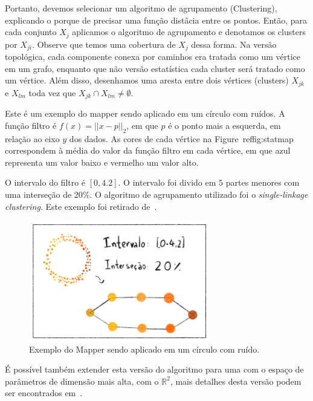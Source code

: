 Portanto, devemos selecionar um algoritmo de agrupamento (Clustering), explicando o 
porque de precisar uma função distâcia entre os pontos. Então, para cada conjunto $X_j$ aplicamos 
o algoritmo de agrupamento e denotamos os clusters por $X_{ji}$. Observe que temos uma cobertura
de $X_j$ dessa forma. Na versão topológica, cada componente conexa por caminhos era tratada como
um vértice em um grafo, enquanto que não versão estatística cada cluster será tratado como
um vértice. Além disso, desenhamos uma aresta entre dois vértices (clusters) $X_{jk}$ e 
$X_{lm}$ toda vez que $X_{jk} \cap X_{lm} \neq \emptyset$.

\begin{ex}
    Este é um exemplo do mapper sendo aplicado em um círculo com ruídos. A função filtro
    é $f(x) = || x - p ||_2$, em que $p$ é o ponto mais a esquerda, em relação ao eixo $y$
    dos dados. As cores de cada vértice na Figure~ref{fig:statmap} correspondem à média
    do valor da função filtro em cada vértice, em que azul representa um valor baixo e 
    vermelho um valor alto. 

    O intervalo do filtro é $[0,4.2]$. O intervalo foi divido em $5$ partes menores com uma
    interseção de $20\%$. O algoritmo de agrupamento utilizado foi o \textit{single-linkage
    clustering}. Este exemplo foi retirado de~\cite{mapper}. 
    \begin{figure}
        \centering
        \includegraphics[width=0.7\textwidth]{images/statmap.png}
        \caption{Exemplo do Mapper sendo aplicado em um círculo com ruído.}
        \label{fig:statmap}
        \fautor
    \end{figure}
\end{ex} 

É possível também extender esta versão do algoritmo para uma com o espaço de parâmetros de dimensão
mais alta, com o $\mathbb{R}^2$, mais detalhes desta versão podem ser encontrados em~\cite{mapper}.

